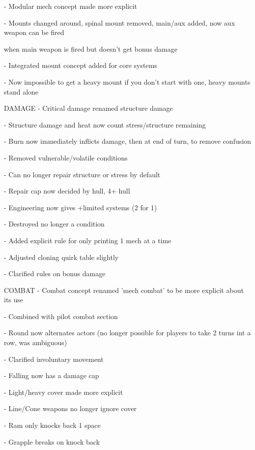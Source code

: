     -    Modular mech concept made more explicit

    -    Mounts changed around, spinal mount removed, main/aux added, now aux weapon can be fired

         when main weapon is fired but doesn't get bonus damage

    -    Integrated mount concept added for core systems

    -    Now impossible to get a heavy mount if you don't start with one, heavy mounts stand alone


DAMAGE
    -    Critical damage renamed structure damage


    -    Structure damage and heat now count stress/structure remaining

    -    Burn now immediately inflicts damage, then at end of turn, to remove confusion

    -    Removed vulnerable/volatile conditions


    -    Can no longer repair structure or stress by default

    -    Repair cap now decided by hull, 4+ hull

    -    Engineering now gives +limited systems (2 for 1)


    -    Destroyed no longer a condition

    -    Added explicit rule for only printing 1 mech at a time

    -    Adjusted cloning quirk table slightly


    -    Clarified rules on bonus damage


COMBAT
    -    Combat concept renamed 'mech combat' to be more explicit about its use

    -    Combined with pilot combat section


    -    Round now alternates actors (no longer possible for players to take 2 turns int a row, was
         ambiguous)

    -    Clarified involuntary movement





     -   Falling now has a damage cap

     -   Light/heavy cover made more explicit


     -   Line/Cone weapons no longer ignore cover

     -   Ram only knocks back 1 space

     -   Grapple breaks on knock back


